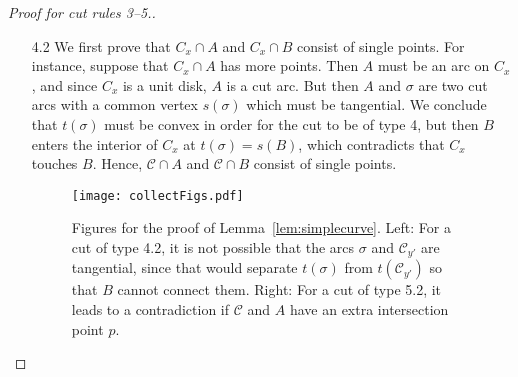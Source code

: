 \documentclass{article}
\newcommand{\PP}{P}
\newcommand{\se}{\sigma}
\newcommand{\cut}{\mathcal C}
\newcommand{\start}{s}
\newcommand{\terminal}{t}
\newcommand{\arcA}{A}
\newcommand{\arcB}{B}
\begin{document}
\begin{proof}[Proof for cut rules 3--5.]
\begin{enumerate}
\begin{enumerate}
Suppose now that $C_a\cap \arcA$ consists of one point and that $C_a\cap\se$ consists of more than one point.
Again, we conclude that $\se$ and $\arcA$ are tangential at $\start(\se)$ and that $\se\subset\partial C_a$.
Now, since $\arcA$ limits $\xi_{\arcA}$, we conclude that $\arcA$ is also a cut arc, but that contradicts our assumption.

On the other hand, if $C_a\cap \arcA$ and $C_a\cap\se$ both consist of single points, then it follows directly that $\cut\cup \partial\PP(\start(\cut),\terminal(\cut))$ is a simple, closed curve, as $\cut\subset C_a$.



\item[4.2]
We first prove that $C_x \cap\arcA$ and $C_x \cap\arcB$ consist of single points.
For instance, suppose that $C_x\cap\arcA$ has more points.
Then $\arcA$ must be an arc on $C_x$, and since $C_x$ is a unit disk, $\arcA$ is a cut arc.
But then $\arcA$ and $\se$ are two cut arcs with a common vertex $\start(\se)$ which must be tangential.
We conclude that $\terminal(\se)$ must be convex in order for the cut to be of type 4, but then $\arcB$ enters the interior of $C_x$ at $\terminal(\se)=\start(\arcB)$, which contradicts that $C_x$ touches $\arcB$.
Hence, $\cut \cap\arcA$ and $\cut \cap\arcB$ consist of single points.

\begin{figure}
\centering
\texttt{[image: collectFigs.pdf]}
\caption{Figures for the proof of Lemma~\ref{lem:simplecurve}.
Left: For a cut of type 4.2, it is not possible that the arcs $\sigma$ and $\cut_{y'}$ are tangential, since that would separate $\terminal(\sigma)$ from $\terminal(\cut_{y'})$ so that $\arcB$ cannot connect them.
Right: For a cut of type 5.2, it leads to a contradiction if $\cut$ and $\arcA$ have an extra intersection point $p$.}
\label{fig:factetc2}
\end{figure}


\end{enumerate}
\end{enumerate}
\end{proof}
\end{document}
